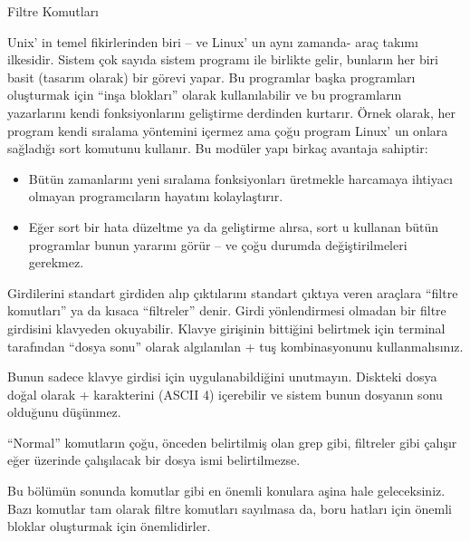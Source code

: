 \begin{section}{Filtre Komutları}

Unix' in temel fikirlerinden biri – ve Linux' un aynı zamanda- araç takımı ilkesidir. Sistem çok sayıda sistem programı ile birlikte gelir, bunların her biri basit (tasarım olarak) bir görevi yapar. Bu programlar başka programları oluşturmak için “inşa blokları” olarak kullanılabilir ve bu programların yazarlarını kendi fonksiyonlarını geliştirme derdinden kurtarır. Örnek olarak, her program kendi sıralama yöntemini içermez ama çoğu program Linux' un onlara sağladığı sort komutunu kullanır. Bu modüler yapı birkaç avantaja sahiptir:

\begin{itemize}
\item Bütün zamanlarını yeni sıralama fonksiyonları üretmekle harcamaya ihtiyacı olmayan programcıların hayatını kolaylaştırır.
\item Eğer sort bir hata düzeltme ya da geliştirme alırsa, sort u kullanan bütün programlar bunun yararını görür –  ve çoğu durumda değiştirilmeleri gerekmez.
\end{itemize}

Girdilerini standart girdiden alıp çıktılarını standart çıktıya veren araçlara “filtre komutları” ya da kısaca “filtreler” denir. Girdi yönlendirmesi olmadan bir filtre girdisini klavyeden okuyabilir. Klavye girişinin bittiğini belirtmek için terminal tarafından “dosya sonu” olarak algılanılan \Ctrl +  tuş kombinasyonunu kullanmalısınız.

Bunun sadece klavye girdisi için uygulanabildiğini unutmayın. Diskteki dosya doğal olarak \Ctrl +  karakterini (ASCII 4) içerebilir ve sistem bunun dosyanın sonu olduğunu düşünmez.

“Normal” komutların çoğu, önceden belirtilmiş olan grep gibi, filtreler gibi çalışır eğer üzerinde çalışılacak bir dosya ismi belirtilmezse.

Bu bölümün sonunda komutlar gibi en önemli konulara aşina hale geleceksiniz. Bazı komutlar tam olarak filtre komutları sayılmasa da, boru hatları için önemli bloklar oluşturmak için önemlidirler.


\end{section}

